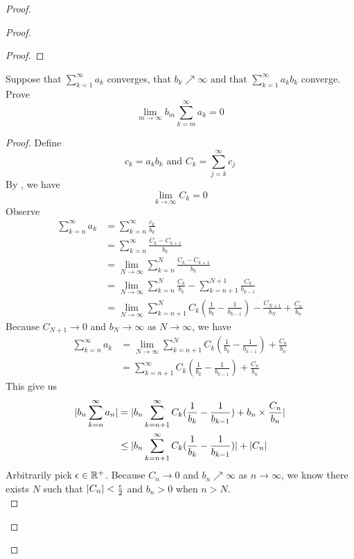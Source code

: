\documentclass{report}
\begin{document}
\begin{proof}
\begin{proof}
\begin{proof}
\end{proof}
\begin{question}{}{}
Suppose that $\sum_{k=1}^{\infty} a_k $ converges, that $b_k \nearrow \infty \text{ and that }\sum_{k=1}^{\infty} a_k b_k $
converge. Prove
\begin{equation}
\lim_{m\to\infty}b_m\sum_{k=m}^\infty a_k=0
\end{equation}
\end{question}
\begin{proof}
Define
\begin{equation}
c_k=a_kb_k\text{ and }C_k=\sum_{j=k}^\infty c_j
\end{equation}
By , we have
\begin{equation}
\lim_{k\to\infty}C_k=0
\end{equation}
Observe
\begin{align}
  \sum_{k=n}^\infty a_k&=\sum_{k= n}^\infty \frac{c_k}{b_k}\\
  &=\sum_{k=n}^\infty \frac{C_k-C_{k+1}}{b_k}\\
  &=\lim_{N\to\infty}\sum^N_{k=n} \frac{C_k-C_{k+1}}{b_k}\\
  &=\lim_{N\to\infty}\sum_{k=n}^N \frac{C_k}{b_k}-\sum_{k=n+1}^{N+1}\frac{C_k}{b_{k-1}}\\
  &=\lim_{N\to\infty} \sum_{k=n+1}^{N} C_k(\frac{1}{b_k}-\frac{1}{b_{k-1}})-\frac{C_{N+1}}{b_N}+\frac{C_n}{b_n}
\end{align}
Because $C_{N+1}\to 0$ and $b_N\to \infty$ as $N\to\infty$, we have
\begin{align}
\sum_{k=n}^\infty a_k&=\lim_{N\to\infty}\sum_{k=n+1}^N C_k(\frac{1}{b_k}-\frac{1}{b_{k-1}})+\frac{C_n}{b_n}\\
&=\sum_{k=n+1}^\infty C_k(\frac{1}{b_k}-\frac{1}{b_{k-1}})+\frac{C_n}{b_n}
\end{align}
This give us
\begin{align}
|b_n\sum_{k=n}^\infty a_n|&=|b_n \sum_{k=n+1}^\infty C_k(\frac{1}{b_k}-\frac{1}{b_{k-1}})+b_n\times \frac{C_n}{b_n}|\\
&\leq |b_n\sum_{k=n+1}^\infty C_k (\frac{1}{b_k}-\frac{1}{b_{k-1}})|+|C_n|
\end{align}
Arbitrarily pick $\epsilon \in\mathbb{R}^+$. Because $C_n\to 0$ and $b_n\nearrow \infty$ as $n\to\infty$, we know there exists $N$ such that  $|C_n|<\frac{\epsilon}{2}$  and $b_n>0$ when $n>N$.\\


\end{proof}
\end{proof}
\end{proof}
\end{document}
